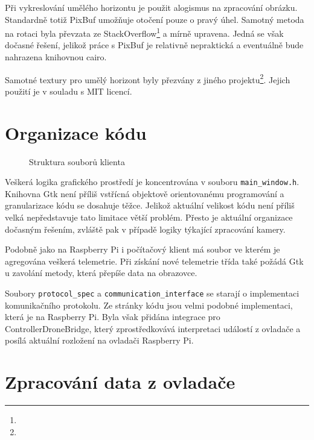 \documentclass[a4paper,oneside,12pt]{report}
\begin{document}
Při vykreslování umělého horizontu je použit alogismus na zpracování obrázku.
Standardně totiž PixBuf umožňuje otočení pouze o pravý úhel.
Samotný metoda na rotaci byla převzata ze StackOverflow\footnote{} a mírně upravena.
Jedná se však dočasné řešení, jelikož práce s PixBuf je relativně nepraktická a eventuálně bude nahrazena knihovnou cairo.

Samotné textury pro umělý horizont byly přezvány z jiného projektu\footnote{}.
Jejich použití je v souladu s MIT licencí.

\section{Organizace kódu}

\begin{figure}[h]
  \caption[Struktura souborů klienta]{Struktura souborů klienta}
\end{figure}

Veškerá logika grafického prostředí je koncentrována v souboru \verb|main_window.h|.
Knihovna Gtk není příliš vstřícná objektově orientovanému programování a granularizace kódu se dosahuje těžce.
Jelikož aktuální velikost kódu není příliš velká nepředstavuje tato limitace větší problém.
Přesto je aktuální organizace dočasným řešením, zvláště pak v případě logiky týkající zpracování kamery.

Podobně jako na Raspberry Pi i počítačový klient má soubor ve kterém je agregována veškerá telemetrie.
Při získání nové telemetrie třída také požádá Gtk u zavolání metody, která přepíše data na obrazovce.

Soubory \verb|protocol_spec| a \verb|communication_interface| se starají o implementaci komunikačního protokolu.
Ze stránky kódu jsou velmi podobné implementaci, která je na Raspberry Pi.
Byla však přidána integrace pro ControllerDroneBridge, který zprostředkovává interpretaci událostí z ovladače a posílá aktuální rozložení na ovladači Raspberry Pi.

\section{Zpracování data z ovladače}
\end{document}
